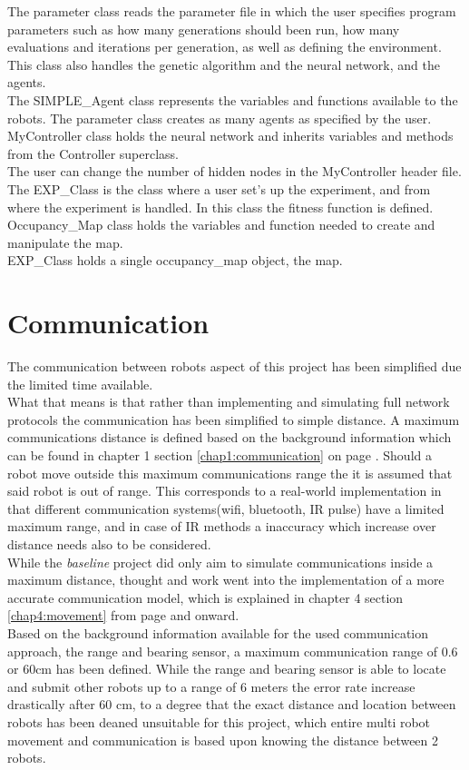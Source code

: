 The parameter class reads the parameter file in which the user specifies program parameters such as how many generations should been run, how many evaluations and iterations per generation, as well as defining the environment.\\
This class also handles the genetic algorithm and the neural network, and the agents.\\
The SIMPLE\_Agent class represents the variables and functions available to the robots. The parameter class creates as many agents as specified by the user.\\

MyController class holds the neural network and inherits variables and methods from the Controller superclass.\\
The user can change the number of hidden nodes in the MyController header file. \\
The EXP\_Class is the class where a user set's up the experiment, and from where the experiment is handled. In this class the fitness function is defined.\\
Occupancy\_Map class holds the variables and function needed to create and manipulate the map.\\
EXP\_Class holds a single occupancy\_map object, the map.

\section{Communication}
The communication between robots aspect of this project has been simplified due the limited time available. \\
What that means is that rather than implementing and simulating full network protocols the communication has been simplified to simple distance. A maximum communications distance is defined based on the background information which can be found in chapter 1 section \ref{chap1:communication} on page \pageref{chap1:communication}. 
Should a robot move outside this maximum communications range the it is assumed that said robot is out of range. This corresponds to a real-world implementation in that different communication systems(wifi, bluetooth, IR pulse) have a limited maximum range, and in case of IR methods a inaccuracy which increase over distance needs also to be considered.\\
While the \textit{baseline} project did only aim to simulate communications inside a maximum distance, thought and work went into the implementation of a more accurate communication model, which is explained in chapter 4 section \ref{chap4:movement} from page \pageref{chap4:movement} and onward.\\
Based on the background information available for the used communication approach, the range and bearing sensor, a maximum communication range of 0.6 or 60cm has been defined. While the range and bearing sensor is able to locate and submit other robots up to a range of 6 meters the error rate increase drastically after 60 cm, to a degree that the exact distance and location between robots has been deaned unsuitable for this project, which entire multi robot movement and communication is based upon knowing the distance between 2 robots.\\

